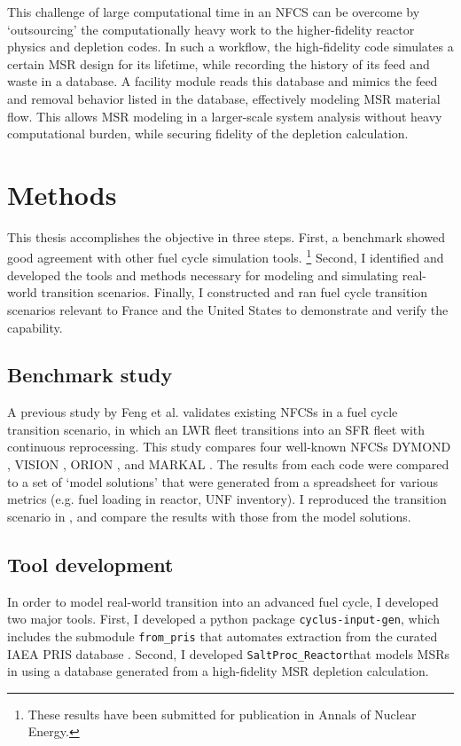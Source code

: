 This challenge of large computational time in an \gls{NFCS} can be overcome by `outsourcing' the computationally
heavy work to the higher-fidelity reactor physics and depletion codes. 
In such a workflow, the high-fidelity code simulates a certain
\gls{MSR} design for its lifetime, while recording the history of its feed and waste in a
database. A \Cyclus facility module reads this database and mimics the feed and removal
behavior listed in the database, effectively modeling \gls{MSR} material flow.
This allows \gls{MSR} modeling in a larger-scale system analysis without heavy computational
burden, while securing fidelity of the depletion calculation.



\section{Methods}
This thesis accomplishes the objective in three steps. 
First, a benchmark showed good agreement with other
fuel cycle simulation tools. \footnote{These results have been
submitted for publication in Annals of Nuclear Energy.}
Second, I identified and developed the tools and methods necessary
for modeling and simulating real-world transition scenarios.
Finally, I constructed and ran fuel cycle transition scenarios
relevant to France and the United States to demonstrate
and verify the capability.

\subsection{Benchmark study}
A previous study by Feng et al. \cite{feng_standardized_2016} validates existing 
\glspl{NFCS} in a fuel cycle transition scenario, in which an \gls{LWR} fleet
transitions into an \gls{SFR} fleet with continuous reprocessing. This 
study compares four well-known \glspl{NFCS}
DYMOND \cite{yacout_modeling_2005},
VISION \cite{jacobson_verifiable_2010},
ORION \cite{gregg_analysis_2012}, and
MARKAL \cite{shay_epa_2006}. The results from each code were
compared to a set of `model solutions' that were generated
from a spreadsheet for various metrics (e.g. fuel loading
in reactor, \gls{UNF} inventory). I reproduced the transition
scenario in \Cyclus, and compare the \Cyclus results with those
from the model solutions.

\subsection{Tool development}
In order to model real-world transition into an advanced
fuel cycle, I developed two major tools. First, I developed a python package \texttt{cyclus-input-gen},
which includes the submodule \texttt{from\_pris}
that automates extraction from the curated \gls{IAEA} \gls{PRIS} database
\cite{iaea_nuclear_2018}. Second, I developed \texttt{SaltProc\_Reactor}that models \glspl{MSR}
in \Cyclus using a database generated from a high-fidelity \gls{MSR} depletion calculation.


